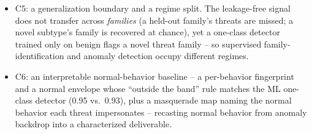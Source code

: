 \documentclass[conference]{IEEEtran}
\begin{document}
\begin{itemize}
\begin{itemize}
      \item C5: a generalization boundary and a regime split. The leakage-free
            signal does not transfer across \emph{families} (a held-out family's
            threats are missed; a novel subtype's family is recovered at chance),
            yet a one-class detector trained only on benign flags a novel threat
            family -- so supervised family-identification and anomaly detection
            occupy different regimes.
      \item C6: an interpretable normal-behavior baseline -- a per-behavior
            fingerprint and a normal envelope whose ``outside the band'' rule
            matches the ML one-class detector (0.95 vs.\ 0.93), plus a masquerade
            map naming the normal behavior each threat impersonates -- recasting
            normal behavior from anomaly backdrop into a characterized deliverable.
    \end{itemize}
\end{itemize}
\end{document}
